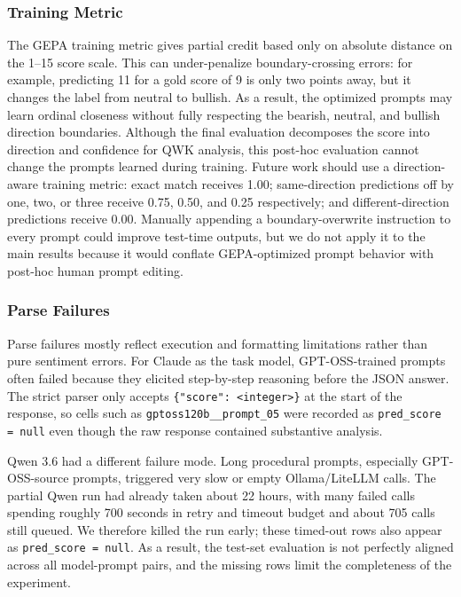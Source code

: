 \documentclass[sigconf,screen]{acmart}
\begin{document}
\subsubsection{Training Metric}
The GEPA training metric gives partial credit based only on absolute distance
on the 1--15 score scale. This can under-penalize boundary-crossing errors:
for example, predicting 11 for a gold score of 9 is only two points away, but
it changes the label from neutral to bullish. As a result, the optimized
prompts may learn ordinal closeness without fully respecting the bearish,
neutral, and bullish direction boundaries. Although the final evaluation
decomposes the score into direction and confidence for QWK analysis, this
post-hoc evaluation cannot change the prompts learned during training. Future
work should use a direction-aware training metric: exact match receives 1.00;
same-direction predictions off by one, two, or three receive 0.75, 0.50, and
0.25 respectively; and different-direction predictions receive 0.00.
Manually appending a boundary-overwrite instruction to every prompt could
improve test-time outputs, but we do not apply it to the main results because
it would conflate GEPA-optimized prompt behavior with post-hoc human prompt
editing.

\subsubsection{Parse Failures}

Parse failures mostly reflect execution and formatting limitations rather than
pure sentiment errors. For Claude as the task model, GPT-OSS-trained prompts
often failed because they elicited step-by-step reasoning before the JSON
answer. The strict parser only accepts \texttt{\{"score": <integer>\}} at the
start of the response, so cells such as \texttt{gptoss120b\_\_prompt\_05}
were recorded as \texttt{pred\_score = null} even though the raw response
contained substantive analysis.

Qwen 3.6 had a different failure mode. Long procedural prompts, especially
GPT-OSS-source prompts, triggered very slow or empty Ollama/LiteLLM calls. The
partial Qwen run had already taken about 22 hours, with many failed calls
spending roughly 700 seconds in retry and timeout budget and about 705 calls
still queued. We therefore killed the run early; these timed-out rows also
appear as \texttt{pred\_score = null}. As a result, the test-set evaluation is
not perfectly aligned across all model-prompt pairs, and the missing rows limit
the completeness of the experiment.
\end{document}
